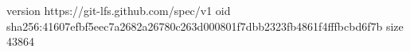 version https://git-lfs.github.com/spec/v1
oid sha256:41607efbf5eec7a2682a26780c263d000801f7dbb2323fb4861f4fffbcbd6f7b
size 43864
